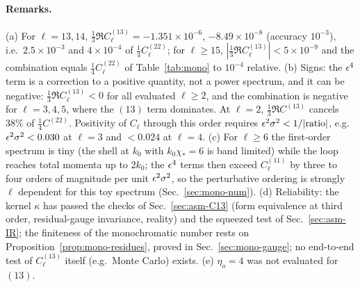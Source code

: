 \paragraph{Remarks.}  (a) For $\ell=13,14$, $\tfrac13\Re C^{(13)}_\ell=-1.351\times10^{-6}$, $-8.49\times10^{-8}$ (accuracy $10^{-3}$), i.e.\ $2.5\times10^{-3}$ and
$4\times10^{-4}$ of $\tfrac14C^{(22)}_\ell$; for $\ell\ge15$, $|\tfrac13\Re C^{(13)}_\ell|<5\times10^{-9}$ and the combination equals $\tfrac14C^{(22)}_\ell$ of
Table~\ref{tab:mono} to $10^{-4}$ relative.  (b) Signs: the $\epsilon^4$ term is a correction to a positive quantity, not a power spectrum, and it can
be negative: $\tfrac13\Re C^{(13)}_\ell<0$ for all evaluated $\ell\ge2$, and the combination is negative for $\ell=3,4,5$, where the $(13)$ term
dominates.  At $\ell=2$, $\tfrac13\Re C^{(13)}$ cancels $38\%$ of $\tfrac14C^{(22)}$.  Positivity of $C_\ell$ through this order requires
$\epsilon^2\sigma^2<1/|{\rm ratio}|$, e.g.\ $\epsilon^2\sigma^2<0.030$ at $\ell=3$ and $<0.024$ at $\ell=4$.  (c) For $\ell\ge6$ the first-order spectrum is tiny (the shell
at $k_0$ with $k_0\chi_*=6$ is band limited) while the loop reaches total momenta up to $2k_0$; the $\epsilon^4$ terms then exceed $C^{(11)}_\ell$ by
three to four orders of magnitude per unit $\epsilon^2\sigma^2$, so the perturbative ordering is strongly $\ell$ dependent for this toy spectrum
(Sec.~\ref{sec:mono-num}).  (d) Reliability: the kernel $\kappa$ has passed the checks of Sec.~\ref{sec:asm-C13} (form equivalence at third order,
residual-gauge invariance, reality) and the squeezed test of Sec.~\ref{sec:asm-IR}; the finiteness of the monochromatic number rests on
Proposition~\ref{prop:mono-residues}, proved in Sec.~\ref{sec:mono-gauge}; no end-to-end test of $C^{(13)}_\ell$ itself (e.g.\ Monte Carlo) exists.  (e) $\eta_o=4$ was not evaluated
for $(13)$.

